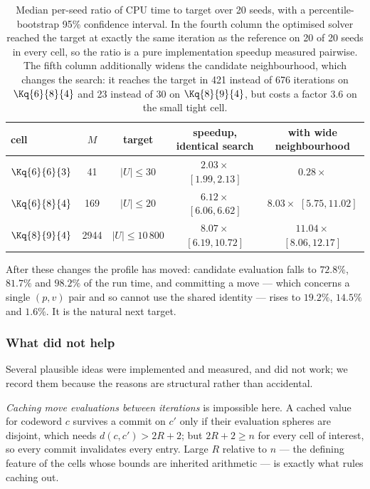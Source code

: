 \begin{table}[t]
\centering
\begin{tabular}{lcccc}
\toprule
cell & $M$ & target & speedup, identical search & with wide neighbourhood \\
\midrule
$\Kq{6}{6}{3}$ & 41   & $|U|\le 30$      & $2.03\times$ $[1.99,2.13]$ & $0.28\times$ \\
$\Kq{6}{8}{4}$ & 169  & $|U|\le 20$      & $6.12\times$ $[6.06,6.62]$ & $8.03\times$ $[5.75,11.02]$ \\
$\Kq{8}{9}{4}$ & 2944 & $|U|\le 10\,800$ & $8.07\times$ $[6.19,10.72]$ & $11.04\times$ $[8.06,12.17]$ \\
\bottomrule
\end{tabular}
\caption{Median per-seed ratio of CPU time to target over 20 seeds, with a
percentile-bootstrap 95\% confidence interval. In the fourth column the
optimised solver reached the target at exactly the same iteration as the
reference on 20 of 20 seeds in every cell, so the ratio is a pure
implementation speedup measured pairwise. The fifth column additionally
widens the candidate neighbourhood, which changes the search: it reaches the
target in 421 instead of 676 iterations on $\Kq{6}{8}{4}$ and 23 instead of
30 on $\Kq{8}{9}{4}$, but costs a factor $3.6$ on the small tight cell.}
\label{tab:engttt}
\end{table}

After these changes the profile has moved: candidate evaluation falls to
$72.8\%$, $81.7\%$ and $98.2\%$ of the run time, and committing a move --- which
concerns a single $(p,v)$ pair and so cannot use the shared identity --- rises
to $19.2\%$, $14.5\%$ and $1.6\%$. It is the natural next target.

\subsubsection*{What did not help}

Several plausible ideas were implemented and measured, and did not work; we
record them because the reasons are structural rather than accidental.

\emph{Caching move evaluations between iterations} is impossible here. A
cached value for codeword $c$ survives a commit on $c'$ only if their
evaluation spheres are disjoint, which needs $d(c,c')>2R+2$; but $2R+2\ge n$
for every cell of interest, so every commit invalidates every entry. Large
$R$ relative to $n$ --- the defining feature of the cells whose bounds are
inherited arithmetic --- is exactly what rules caching out.

